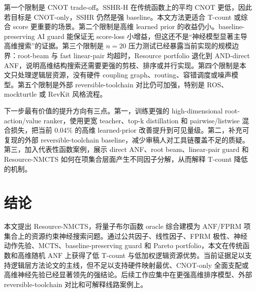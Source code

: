\documentclass[UTF8,fontset=macnew,11pt]{ctexart}
\newcommand{\method}{Resource-NMCTS}
\newcommand{\anf}{\ensuremath{\mathrm{ANF}}}
\newcommand{\fprm}{\ensuremath{\mathrm{FPRM}}}
\newcommand{\mcts}{\ensuremath{\mathrm{MCTS}}}
\begin{document}
第一个限制是 CNOT trade-off。SSHR-H 在传统函数上的平均 CNOT 更低，因此若目标是 CNOT-only，SSHR 仍然是强 baseline。本文方法更适合 T-count 或综合 score 更重要的场景。第二个限制是高维 learned prior 的收益仍小。baseline-preserving AI guard 能保证无 score-loss 小增益，但这还不是“神经模型显著主导高维搜索”的证据。第三个限制是 $n=20$ 压力测试已经暴露当前实现的规模边界：root-beam 与 fast linear-pair 均超时，Resource portfolio 退化到 AND-direct ANF，说明高维结构搜索还需要更强的剪枝、排序或并行实现。第四个限制是本文只处理逻辑层资源，没有硬件 coupling graph、routing、容错调度或噪声模型。第五个限制是外部 reversible-toolchain 对比仍可加强，特别是 ROS、mockturtle 或 RevKit 风格流程。

下一步最有价值的提升方向有三点。第一，训练更强的 high-dimensional root-action/value ranker，使用更宽 teacher、top-k distillation 和 pairwise/listwise 混合损失，把当前 0.04\% 的高维 learned-prior 改善提升到可见量级。第二，补充可复现的外部 reversible-toolchain baseline，减少审稿人对工具链覆盖不足的质疑。第三，加入代表性函数案例，展示 direct ANF、root beam、linear-pair guard 和 \method{} 如何在项集合层面产生不同因子分解，从而解释 T-count 降低的机制。

\section{结论}

本文提出 \method{}，将量子布尔函数 oracle 综合建模为 \anf{}/\fprm{} 项集合上的资源约束神经搜索问题。通过公共因子、线性因子、FPRM 极性、神经动作先验、\mcts{}、baseline-preserving guard 和 Pareto portfolio，本文在传统函数和高维随机 \anf{} 上获得了低 T-count 与低加权逻辑资源优势。当前证据足以支持逻辑层方法论文的主线，但不足以支持硬件映射最优、CNOT-only 全面支配或高维神经先验已经显著领先的强结论。后续工作应集中在更强高维排序模型、外部 reversible-toolchain 对比和可解释线路案例上。
\end{document}
